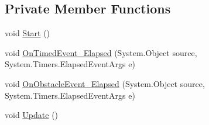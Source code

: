 \subsection*{Private Member Functions}
\begin{DoxyCompactItemize}
\item 
void \hyperlink{class_spawn_obstacle_ac1cc195163c333ad19d7b234fa6fb717}{Start} ()
\item 
void \hyperlink{class_spawn_obstacle_a4bb922374a8cace9764162b060d73ad7}{On\+Timed\+Event\+\_\+\+Elapsed} (System.\+Object source, System.\+Timers.\+Elapsed\+Event\+Args e)
\item 
void \hyperlink{class_spawn_obstacle_ab2292dd85546b40f5c9e7c2cbf8e5198}{On\+Obstacle\+Event\+\_\+\+Elapsed} (System.\+Object source, System.\+Timers.\+Elapsed\+Event\+Args e)
\item 
void \hyperlink{class_spawn_obstacle_abf68463f09c58b50d42ede1be0a5d7ec}{Update} ()
\end{DoxyCompactItemize}
